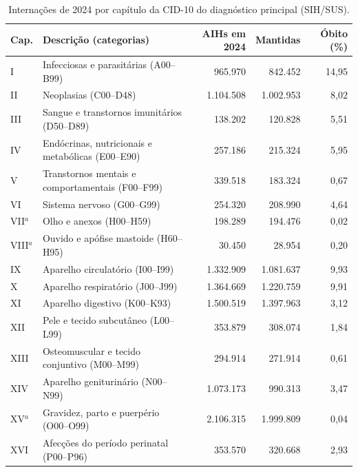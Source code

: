 \begin{table}[htbp]
  \centering
  \caption{Internações de 2024 por capítulo da CID-10 do diagnóstico principal (SIH/SUS).}
  \label{tab:sih-capitulos}
  \small
  \begin{tabular}{llrrr}
    \toprule
    Cap. & Descrição (categorias) & AIHs em 2024 & Mantidas & Óbito (\%) \\
    \midrule
    I     & Infecciosas e parasitárias (A00--B99)               &   965.970 &   842.452 & 14,95 \\
    II    & Neoplasias (C00--D48)                               & 1.104.508 & 1.002.953 &  8,02 \\
    III   & Sangue e transtornos imunitários (D50--D89)         &   138.202 &   120.828 &  5,51 \\
    IV    & Endócrinas, nutricionais e metabólicas (E00--E90)   &   257.186 &   215.324 &  5,95 \\
    V     & Transtornos mentais e comportamentais (F00--F99)    &   339.518 &   183.324 &  0,67 \\
    VI    & Sistema nervoso (G00--G99)                          &   254.320 &   208.990 &  4,64 \\
    VII$^{a}$ & Olho e anexos (H00--H59)                        &   198.289 &   194.476 &  0,02 \\
    VIII$^{a}$ & Ouvido e apófise mastoide (H60--H95)                &    30.450 &    28.954 &  0,20 \\
    IX    & Aparelho circulatório (I00--I99)                    & 1.332.909 & 1.081.637 &  9,93 \\
    X     & Aparelho respiratório (J00--J99)                    & 1.364.669 & 1.220.759 &  9,91 \\
    XI    & Aparelho digestivo (K00--K93)                       & 1.500.519 & 1.397.963 &  3,12 \\
    XII   & Pele e tecido subcutâneo (L00--L99)                 &   353.879 &   308.074 &  1,84 \\
    XIII  & Osteomuscular e tecido conjuntivo (M00--M99)        &   294.914 &   271.914 &  0,61 \\
    XIV   & Aparelho geniturinário (N00--N99)                   & 1.073.173 &   990.313 &  3,47 \\
    XV$^{a}$ & Gravidez, parto e puerpério (O00--O99)           & 2.106.315 & 1.999.809 &  0,04 \\
    XVI   & Afecções do período perinatal (P00--P96)            &   353.570 &   320.668 &  2,93 \\

\end{tabular}
\end{table}
